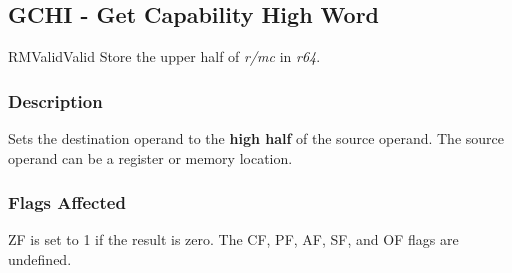 \clearpage
{}
{}
\subsection*{GCHI - Get Capability High Word}

\begin{x86opcodetable}
  {RM}{Valid}{Valid}
  {Store the upper half of \emph{r/mc} in \emph{r64}.}
\end{x86opcodetable}

\begin{x86opentable}
\end{x86opentable}

\subsubsection*{Description}

Sets the destination operand to the \textbf{high half} of the source
operand.  The source operand can be a register or memory location.

\subsubsection*{Flags Affected}

ZF is set to 1 if the result is zero.  The CF, PF, AF, SF, and OF
flags are undefined.
